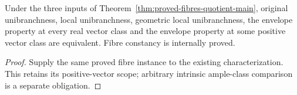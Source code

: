 \begin{corollary}
\label{cor:proved-fibres-quotient-characterization}
\leanok
Under the three inputs of Theorem~\ref{thm:proved-fibres-quotient-main}, original
unibranchness, local unibranchness, geometric local unibranchness, the envelope
property at every real vector class and the envelope property at some positive
vector class are equivalent. Fibre constancy is internally proved.
\end{corollary}
\begin{proof}
Supply the same proved fibre instance to the existing characterization.
This retains its positive-vector scope; arbitrary intrinsic ample-class
comparison is a separate obligation.
\end{proof}
